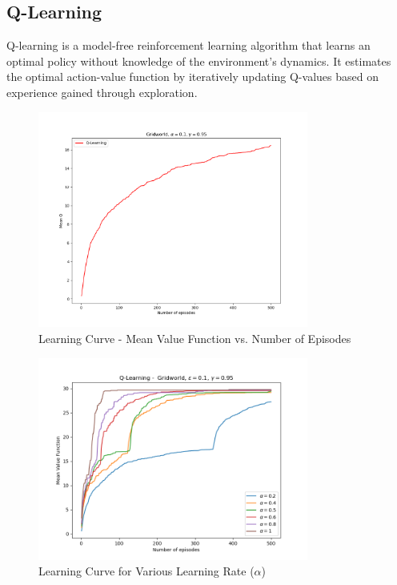 \documentclass[conference]{IEEEtran}
\begin{document}
\subsection{Q-Learning}

Q-learning is a model-free reinforcement learning algorithm that learns an optimal policy without knowledge of the environment's dynamics. It estimates the optimal action-value function by iteratively updating Q-values based on experience gained through exploration. \cite{b1}

\begin{figure}[!htbp]
\centerline{\includegraphics[width=3.5in]{g_ql_learning_curve}}
\caption{Learning Curve - Mean Value Function vs. Number of Episodes}
\label{fig}
\end{figure}
\FloatBarrier

\begin{figure}[!htbp]
\centerline{\includegraphics[width=3.5in]{g_ql_learning_curves_alpha}}
\caption{Learning Curve for Various Learning Rate ($\alpha$)}
\label{fig}
\end{figure}
\FloatBarrier
\end{document}
